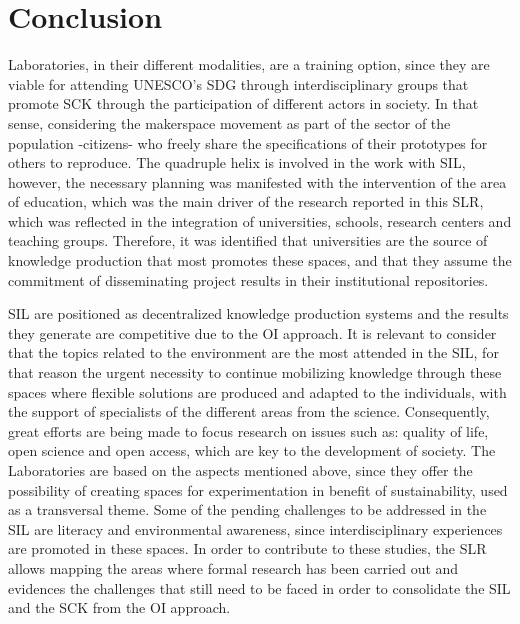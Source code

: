\documentclass[english]{textolivre}
\begin{document}
\section{Conclusion}
Laboratories, in their different modalities, are a training option, since they are viable for attending UNESCO's SDG through interdisciplinary groups that promote SCK through the participation of different actors in society. In that sense, considering the makerspace movement as part of the sector of the population -citizens- who freely share the specifications of their prototypes for others to reproduce. The quadruple helix is involved in the work with SIL, however, the necessary planning was manifested with the intervention of the area of education, which was the main driver of the research reported in this SLR, which was reflected in the integration of universities, schools, research centers and teaching groups. Therefore, it was identified that universities are the source of knowledge production that most promotes these spaces, and that they assume the commitment of disseminating project results in their institutional repositories. 

SIL are positioned as decentralized knowledge production systems and the results they generate are competitive due to the OI approach. It is relevant to consider that the topics related to the environment are the most attended in the SIL, for that reason the urgent necessity to continue mobilizing knowledge through these spaces where flexible solutions are produced and adapted to the individuals, with the support of specialists of the different areas from the science. Consequently, great efforts are being made to focus research on issues such as: quality of life, open science and open access, which are key to the development of society. The Laboratories are based on the aspects mentioned above, since they offer the possibility of creating spaces for experimentation in benefit of sustainability, used as a transversal theme. Some of the pending challenges to be addressed in the SIL are literacy and environmental awareness, since interdisciplinary experiences are promoted in these spaces. In order to contribute to these studies, the SLR allows mapping the areas where formal research has been carried out and evidences the challenges that still need to be faced in order to consolidate the SIL and the SCK from the OI approach. 

\printbibliography\label{sec-bib}
\end{document}
